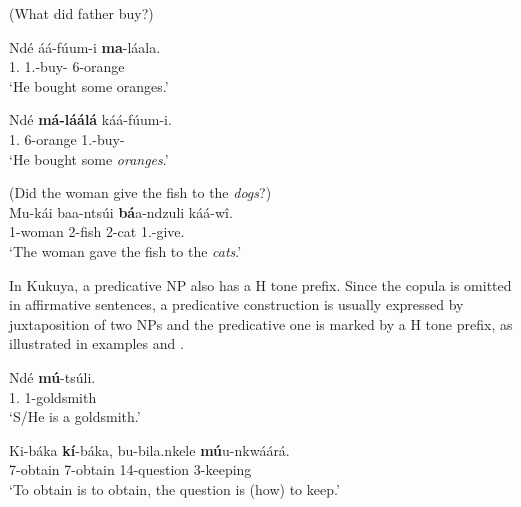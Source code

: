 \documentclass[output=paper,colorlinks,citecolor=brown,
]{langscibook}
\begin{document}
\begin{exe}
    \ex (What did father buy?)\label{152}
    \begin{xlist}
\ex
\label{152a}
\gll
Ndé áá-fúum-i \textbf{ma}-láala.\\
1.\Pro{} 1\Sm{}.\Pst{}-buy-\Pst{} 6-orange\\
\trans ‘He bought some oranges.’

\ex
\label{152b}
\gll
Ndé \textbf{má-láálá} káá-fúum-i.\\
1.\Pro{} 6-orange 1\Sm{}.\Pst{}-buy-\Pst{}\\
\trans ‘He bought some \textit{oranges}.’

    \end{xlist}
\end{exe}
\begin{exe}
\ex
\label{153}
 (Did the woman give the fish to the \textit{dogs}?)\\
\gll
Mu-kái baa-ntsúi \textbf{bá}a-ndzuli káá-wî.\\
1-woman 2-fish 2-cat 1\Sm{}.\Pst{}-give.\Pst{}\\
\trans ‘The woman gave the fish to the \textit{cats}.’

\end{exe}
In Kukuya, a predicative NP also has a H tone prefix. Since the copula is omitted in affirmative sentences, a predicative construction is usually expressed by juxtaposition of two NPs and the predicative one is marked by a H tone prefix, as illustrated in examples  and .
\begin{exe}
\ex
\label{154}
\gll
Ndé \textbf{mú}-tsúli.\\
1.\Pro{} 1-goldsmith\\
\trans ‘S/He is a goldsmith.’ 

\end{exe}
\begin{exe}
\ex
\label{155}
\gll
Ki-báka \textbf{kí}-báka, bu-bila.nkele \textbf{mú}u-nkwáárá.\\
7-obtain 7-obtain 14-question 3-keeping\\
\trans ‘To obtain is to obtain, the question is (how) to keep.’        

\end{exe}
\end{document}
